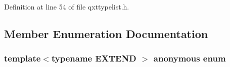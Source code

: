 Definition at line 54 of file qxttypelist.\-h.



\subsection{Member Enumeration Documentation}
\hypertarget{struct_qxt_type_1_1_qxt_type_list_3_01_no_extend_00_01_no_extend_00_01_no_extend_00_01_no_extendaa1bb8779fce2c4754d395885150af9f_af3b11a3d2c0a70213a5d63b4c245e283}{\subsubsection[{anonymous enum}]{\setlength{\rightskip}{0pt plus 5cm}template$<$typename E\-X\-T\-E\-N\-D $>$ anonymous enum}}\label{struct_qxt_type_1_1_qxt_type_list_3_01_no_extend_00_01_no_extend_00_01_no_extend_00_01_no_extendaa1bb8779fce2c4754d395885150af9f_af3b11a3d2c0a70213a5d63b4c245e283}
